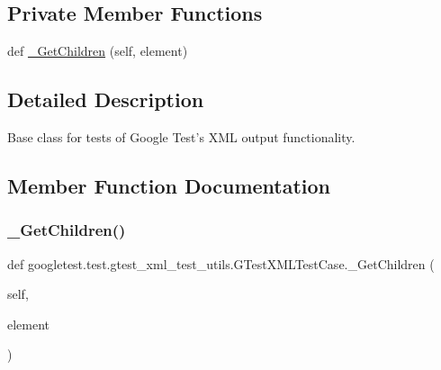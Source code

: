 \subsection*{Private Member Functions}
\begin{DoxyCompactItemize}
\item 
def \mbox{\hyperlink{classgoogletest_1_1test_1_1gtest__xml__test__utils_1_1_g_test_x_m_l_test_case_a74b9bb5bbca9a007f89cc9373bc6456c}{\+\_\+\+Get\+Children}} (self, element)
\end{DoxyCompactItemize}


\subsection{Detailed Description}
\begin{DoxyVerb}Base class for tests of Google Test's XML output functionality.
\end{DoxyVerb}
 

\subsection{Member Function Documentation}
\mbox{\label{classgoogletest_1_1test_1_1gtest__xml__test__utils_1_1_g_test_x_m_l_test_case_a74b9bb5bbca9a007f89cc9373bc6456c}} 
\subsubsection{\texorpdfstring{\_GetChildren()}{\_GetChildren()}}
{\footnotesize\ttfamily def googletest.\+test.\+gtest\+\_\+xml\+\_\+test\+\_\+utils.\+G\+Test\+X\+M\+L\+Test\+Case.\+\_\+\+Get\+Children (\begin{DoxyParamCaption}\item[{}]{self,  }\item[{}]{element }\end{DoxyParamCaption})\hspace{0.3cm}{\ttfamily [private]}}

